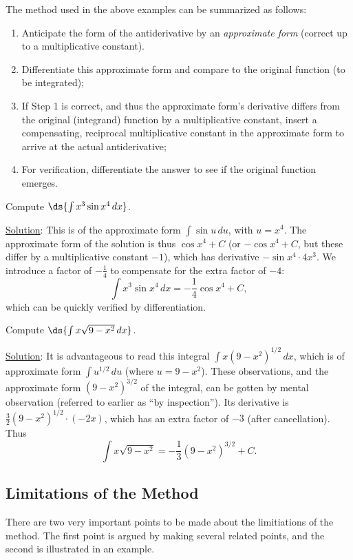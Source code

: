 The method used in the above examples can be summarized as follows:
\begin{enumerate}
\item Anticipate the form of the antiderivative by an {\it approximate form}
      (correct up to a multiplicative constant).
\item Differentiate this approximate form and compare to the original
      function (to be integrated);
\item If Step 1 is correct, and thus the approximate form's derivative 
      differs from the original (integrand) function by a multiplicative 
      constant, insert a compensating,
      reciprocal multiplicative constant in the approximate form to arrive
      at the actual antiderivative;
\item For verification, differentiate the answer to see if the
      original function emerges.
\end{enumerate}

\bex Compute $\ds{\int x^3\sin x^4\,dx}$.

\underline{Solution}: This is of the approximate form
$\int\sin u\,du$, with $u=x^4$. The approximate form of the solution
is thus $\cos x^4+C$ (or $-\cos x^4+C$, but these differ by 
a multiplicative constant $-1$), which has derivative
$-\sin x^4\cdot4x^3$.  We introduce a factor of $-\frac14$
to compensate for the extra factor of $-4$:
$$\int x^3\sin x^4\,dx=-\frac14\cos x^4+C,$$
which can be quickly verified by differentiation.
\eex

\bex Compute $\ds{\int x\sqrt{9-x^2}\,dx}$.

\underline{Solution}: It is advantageous to read this
integral $\int x(9-x^2)^{1/2}\,dx$, which is of
approximate form $\int u^{1/2}\,du$ (where $u=9-x^2$).  These observations,
and the approximate form $(9-x^2)^{3/2}$ of the integral, can be 
gotten by mental observation (referred to earlier as
``by inspection'').  Its derivative
is $\frac32(9-x^2)^{1/2}\cdot(-2x)$, which
has an extra factor of $-3$ (after cancellation).
Thus
$$\int x\sqrt{9-x^2}=-\frac13\left(9-x^2\right)^{3/2}+C.$$


\eex






\subsection{Limitations of the Method}
There are two very important points to be made about the
limitiations of the method.  The first point is argued
by making several related points, and the second is illustrated in
an example.

